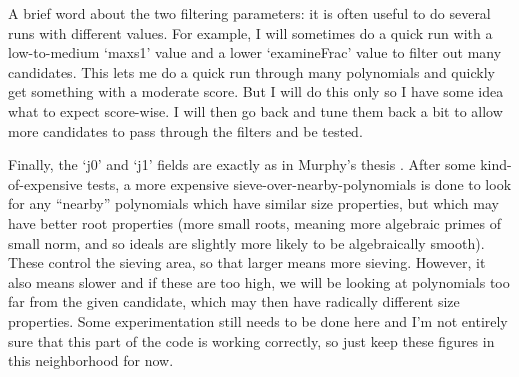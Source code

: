 \documentclass[12pt]{article}
\begin{document}
  A brief word about the two filtering parameters: it is often useful to
  do several runs with different values. For example, I will sometimes do
  a quick run with a low-to-medium `maxs1' value and a lower `examineFrac'
  value to filter out many candidates. This lets me do a quick run through
  many polynomials and quickly get something with a moderate score. But I
  will do this only so I have some idea what to expect score-wise. I will
  then go back and tune them back a bit to allow more candidates to pass
  through the filters and be tested.

  Finally, the `j0' and `j1' fields are exactly as in Murphy's thesis 
  \cite{Murphy1999}. After some kind-of-expensive tests, a more expensive
  sieve-over-nearby-polynomials is done to look for any ``nearby'' polynomials
  which have similar size properties, but which may have better root properties
  (more small roots, meaning more algebraic primes of small norm, and so
  ideals are slightly more likely to be algebraically smooth). These control
  the sieving area, so that larger means more sieving. However, it also means
  slower and if these are too high, we will be looking at polynomials too far
  from the given candidate, which may then have radically different size properties.
  Some experimentation still needs to be done here and I'm not entirely sure
  that this part of the code is working correctly, so just keep these figures
  in this neighborhood for now.

\end{document}
